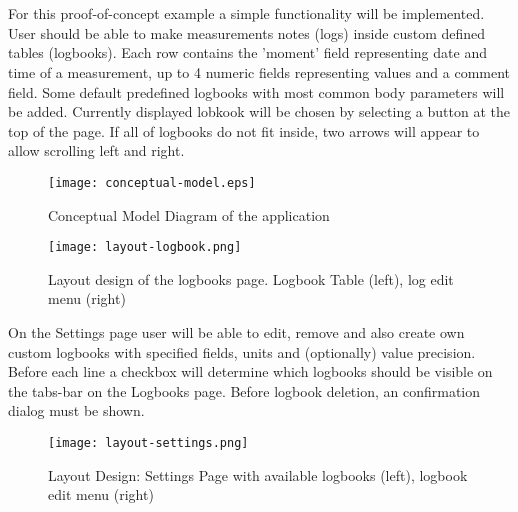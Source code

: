 \chapter{}%
\label{ch:poc}

\section{}%
\label{sec:design}

For this proof-of-concept example a simple functionality will be implemented. User should be able to make measurements notes (logs) inside custom defined tables (logbooks). Each row contains the 'moment' field representing date and time of a measurement, up to 4 numeric fields representing values and a comment field. Some default predefined logbooks with most common body parameters will be added. Currently displayed lobkook will be chosen by selecting a button at the top of the page. If all of logbooks do not fit inside, two arrows will appear to allow scrolling left and right.

\begin{figure}[H]
    \centering
    \texttt{[image: conceptual-model.eps]}
    \caption[Conceptual Model Diagram]{\label{fig:conceptmodel} Conceptual Model Diagram of the application}
\end{figure}

\begin{figure}[H]
    \centering
    \texttt{[image: layout-logbook.png]}
    \caption[Logbooks page layout design]{\label{fig:layoutlogbook} Layout design of the logbooks page. Logbook Table (left), log edit menu (right) }
\end{figure}

On the Settings page user will be able to edit, remove and also create own custom logbooks with specified fields, units and (optionally) value precision. Before each line a checkbox will determine which logbooks should be visible on the tabs-bar on the Logbooks page. Before logbook deletion, an confirmation dialog must be shown.

\begin{figure}[H]
    \centering
    \texttt{[image: layout-settings.png]}
    \caption[Settings page layout design]{\label{fig:layoutsettings} Layout Design: Settings Page with available logbooks (left), logbook edit menu (right)}
\end{figure}

